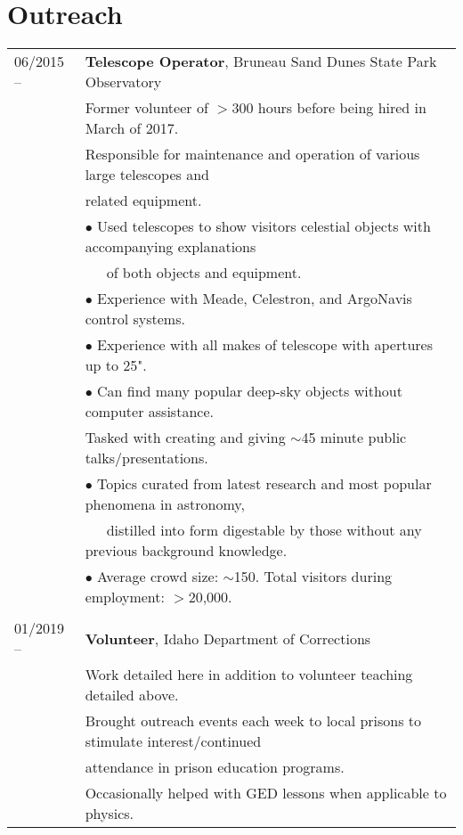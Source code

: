 \documentclass[11pt]{article}
\begin{document}
\section {Outreach}
\begin{tabular}{ll}
06/2015 --    &   \textbf{Telescope Operator}, Bruneau Sand Dunes State Park Observatory \\
      & Former volunteer of $>$300 hours before being hired in March of 2017.\vspace{1mm} \\
      & Responsible for maintenance and operation of various large telescopes and \\
      & related equipment.\\
      & $\bullet$ Used telescopes to show visitors celestial objects with accompanying explanations \\
      & \-\ \-\ \-\ of both objects and equipment.\\
      & $\bullet$ Experience with Meade, Celestron, and ArgoNavis control systems.\\
      & $\bullet$ Experience with all makes of telescope with apertures up to 25".\\
      & $\bullet$ Can find many popular deep-sky objects without computer assistance.\vspace{1mm} \\
      & Tasked with creating and giving $\sim$45 minute public talks/presentations.\\
      & $\bullet$ Topics curated from latest research and most popular phenomena in astronomy, \\
      & \-\ \-\ \-\ distilled into form digestable by those without any previous background knowledge.\\
      & $\bullet$ Average crowd size: $\sim$150. Total visitors during employment: $>$20,000.\\
      & \\
01/2019 --    &   \textbf{Volunteer}, Idaho Department of Corrections  \\
      & Work detailed here in addition to volunteer teaching detailed above. \vspace{1mm} \\
      & Brought outreach events each week to local prisons to stimulate interest/continued \\
      & attendance in prison education programs. \\
      & Occasionally helped with GED lessons when applicable to physics.\\

\end{tabular}
\end{document}
